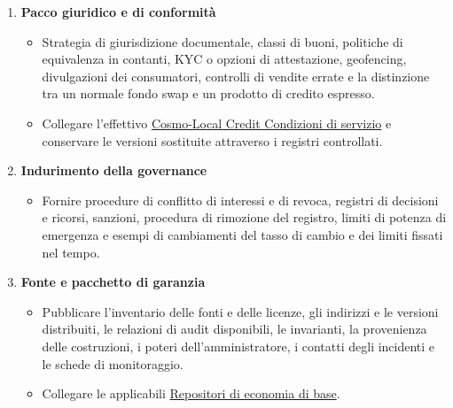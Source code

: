 \documentclass[11pt]{article}
\begin{document}
\begin{enumerate}[leftmargin=*]
\begin{itemize}[leftmargin=*]
\end{itemize}
\item \textbf{Pacco giuridico e di conformità}
\begin{itemize}[leftmargin=*]
\item Strategia di giurisdizione documentale, classi di buoni, politiche di equivalenza in contanti, KYC o opzioni di attestazione, geofencing, divulgazioni dei consumatori, controlli di vendite errate e la distinzione tra un normale fondo swap e un prodotto di credito espresso.
\item Collegare l'effettivo \href{https://docs.cosmolocal.credit/it/governance/terms}{Cosmo-Local Credit Condizioni di servizio} e conservare le versioni sostituite attraverso i registri controllati.
\end{itemize}
\item \textbf{Indurimento della governance}
\begin{itemize}[leftmargin=*]
\item Fornire procedure di conflitto di interessi e di revoca, registri di decisioni e ricorsi, sanzioni, procedura di rimozione del registro, limiti di potenza di emergenza e esempi di cambiamenti del tasso di cambio e dei limiti fissati nel tempo.
\end{itemize}
\item \textbf{Fonte e pacchetto di garanzia}
\begin{itemize}[leftmargin=*]
\item Pubblicare l'inventario delle fonti e delle licenze, gli indirizzi e le versioni distribuiti, le relazioni di audit disponibili, le invarianti, la provenienza delle costruzioni, i poteri dell'amministratore, i contatti degli incidenti e le schede di monitoraggio.
\item Collegare le applicabili \href{https://github.com/grassrootseconomics}{Repositori di economia di base}.
\end{itemize}
\end{enumerate}
\end{document}
